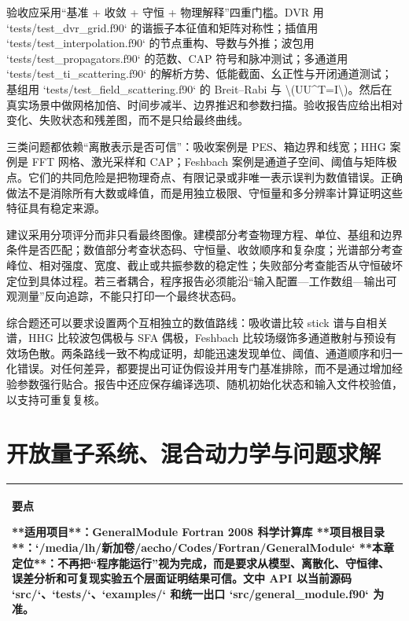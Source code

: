 \documentclass[UTF8,openany,11pt,fontset=fandol]{ctexbook}
\begin{document}
验收应采用``基准 + 收敛 + 守恒 + 物理解释''四重门槛。DVR 用
`tests/test\_dvr\_grid.f90` 的谐振子本征值和矩阵对称性；插值用
`tests/test\_interpolation.f90` 的节点重构、导数与外推；波包用
`tests/test\_propagators.f90` 的范数、CAP 符号和脉冲测试；多通道用
`tests/test\_ti\_scattering.f90`
的解析方势、低能截面、幺正性与开闭通道测试；基组用
`tests/test\_field\_scattering.f90` 的 Breit--Rabi 与
\textbackslash(UU\^{}T=I\textbackslash)。然后在真实场景中做网格加倍、时间步减半、边界推迟和参数扫描。验收报告应给出相对变化、失败状态和残差图，而不是只给最终曲线。

三类问题都依赖``离散表示是否可信''：吸收案例是 PES、箱边界和线宽；HHG
案例是 FFT 网格、激光采样和 CAP；Feshbach
案例是通道子空间、阈值与矩阵极点。它们的共同危险是把物理奇点、有限记录或非唯一表示误判为数值错误。正确做法不是消除所有大数或峰值，而是用独立极限、守恒量和多分辨率计算证明这些特征具有稳定来源。

建议采用分项评分而非只看最终图像。建模部分考查物理方程、单位、基组和边界条件是否匹配；数值部分考查状态码、守恒量、收敛顺序和复杂度；光谱部分考查峰位、相对强度、宽度、截止或共振参数的稳定性；失败部分考查能否从守恒破坏定位到具体过程。若三者耦合，程序报告必须能沿``输入配置---工作数组---输出可观测量''反向追踪，不能只打印一个最终状态码。

综合题还可以要求设置两个互相独立的数值路线：吸收谱比较 stick
谱与自相关谱，HHG 比较波包偶极与 SFA 偶极，Feshbach
比较场缀饰多通道散射与预设有效场色散。两条路线一致不构成证明，却能迅速发现单位、阈值、通道顺序和归一化错误。对任何差异，都要提出可证伪假设并用专门基准排除，而不是通过增加经验参数强行贴合。报告中还应保存编译选项、随机初始化状态和输入文件校验值，以支持可重复复核。

\chapter{开放量子系统、混合动力学与问题求解}\label{ux6df1ux5316ux7248ux95eeux9898ux6c42ux89e3ux5f00ux653eux91cfux5b50ux7cfbux7edfux4e0eux6df7ux5408ux52a8ux529bux5b66}

\begin{longtable}[]{@{}l@{}}
\toprule
\endhead
\begin{minipage}[t]{0.97\columnwidth}\raggedright
\textbf{要点}

**适用项目**：GeneralModule Fortran 2008 科学计算库
**项目根目录**：`/media/lh/新加卷/aecho/Codes/Fortran/GeneralModule`
**本章定位**：不再把``程序能运行''视为完成，而是要求从模型、离散化、守恒律、误差分析和可复现实验五个层面证明结果可信。文中
API 以当前源码 `src/`、`tests/`、`examples/` 和统一出口
`src/general\_module.f90` 为准。\strut
\end{minipage}\tabularnewline
\bottomrule
\end{longtable}
\end{document}
